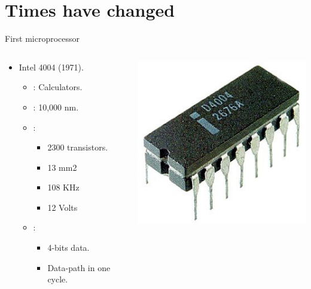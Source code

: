 \section{Times have changed}

\begin{frame}[t]{First microprocessor}
\begin{columns}[T]
  \begin{column}{.7\textwidth}
    \begin{itemize}
      \item Intel 4004 (1971).
        \begin{itemize}
          \item {}: Calculators.
          \item {}: 10,000 nm.
          \vfill
          \item {}:
            \begin{itemize}
              \item 2300 transistors.
              \item 13 mm2
              \item 108 KHz
              \item 12 Volts
            \end{itemize}
          \vfill
          \item {}:
            \begin{itemize}
              \item 4-bits data.
              \item Data-path in one cycle.
            \end{itemize}
      \end{itemize}
    \end{itemize}
  \end{column}
  \begin{column}{.3\textwidth}
    \includegraphics[width=.8\textwidth]{images/intel-4004.jpg}\\

\end{column}
\end{columns}
\end{frame}
